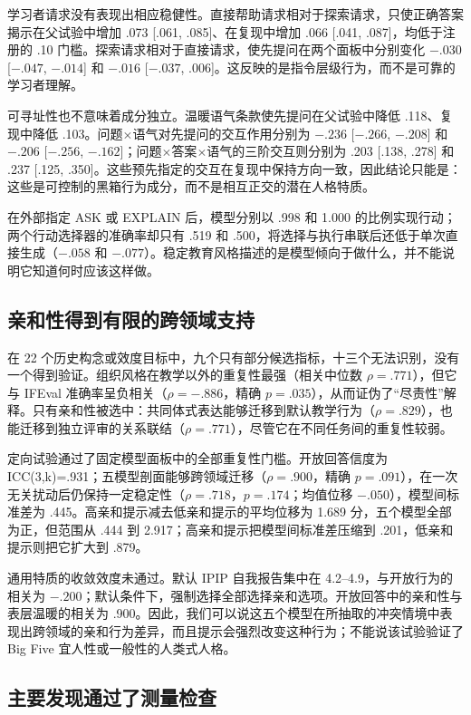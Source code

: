 \documentclass[11pt,a4paper,UTF8]{ctexart}
\begin{document}
学习者请求没有表现出相应稳健性。直接帮助请求相对于探索请求，只使正确答案揭示在父试验中增加 .073 [.061, .085]、在复现中增加 .066 [.041, .087]，均低于注册的 .10 门槛。探索请求相对于直接请求，使先提问在两个面板中分别变化 $-.030$ [$-.047$, $-.014$] 和 $-.016$ [$-.037$, .006]。这反映的是指令层级行为，而不是可靠的学习者理解。

可寻址性也不意味着成分独立。温暖语气条款使先提问在父试验中降低 .118、复现中降低 .103。问题$\times$语气对先提问的交互作用分别为 $-.236$ [$-.266$, $-.208$] 和 $-.206$ [$-.256$, $-.162$]；问题$\times$答案$\times$语气的三阶交互则分别为 .203 [.138, .278] 和 .237 [.125, .350]。这些预先指定的交互在复现中保持方向一致，因此结论只能是：这些是可控制的黑箱行为成分，而不是相互正交的潜在人格特质。

在外部指定 ASK 或 EXPLAIN 后，模型分别以 .998 和 1.000 的比例实现行动；两个行动选择器的准确率却只有 .519 和 .500，将选择与执行串联后还低于单次直接生成（$-.058$ 和 $-.077$）。稳定教育风格描述的是模型倾向于做什么，并不能说明它知道何时应该这样做。

\subsection{亲和性得到有限的跨领域支持}

在 22 个历史构念或效度目标中，九个只有部分候选指标，十三个无法识别，没有一个得到验证。组织风格在教学以外的重复性最强（相关中位数 $\rho=.771$），但它与 IFEval 准确率呈负相关（$\rho=-.886$，精确 $p=.035$），从而证伪了“尽责性”解释。只有亲和性被选中：共同体式表达能够迁移到默认教学行为（$\rho=.829$），也能迁移到独立评审的关系联结（$\rho=.771$），尽管它在不同任务间的重复性较弱。

定向试验通过了固定模型面板中的全部重复性门槛。开放回答信度为 ICC(3,k)=.931；五模型剖面能够跨领域迁移（$\rho=.900$，精确 $p=.091$），在一次无关扰动后仍保持一定稳定性（$\rho=.718$，$p=.174$；均值位移 $-.050$），模型间标准差为 .445。高亲和提示减去低亲和提示的平均位移为 1.689 分，五个模型全部为正，但范围从 .444 到 2.917；高亲和提示把模型间标准差压缩到 .201，低亲和提示则把它扩大到 .879。

通用特质的收敛效度未通过。默认 IPIP 自我报告集中在 4.2--4.9，与开放行为的相关为 $-.200$；默认条件下，强制选择全部选择亲和选项。开放回答中的亲和性与表层温暖的相关为 .900。因此，我们可以说这五个模型在所抽取的冲突情境中表现出跨领域的亲和行为差异，而且提示会强烈改变这种行为；不能说该试验验证了 Big Five 宜人性或一般性的人类式人格。

\subsection{主要发现通过了测量检查}
\end{document}
